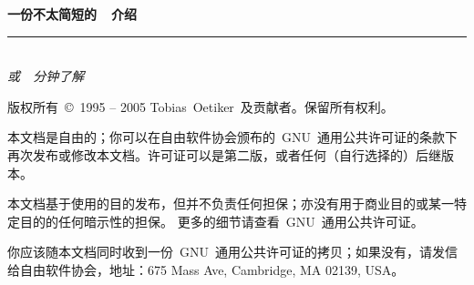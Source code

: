 \thispagestyle{empty}

\noindent\begin{minipage}{\textwidth}
\raggedleft
{\huge \bfseries 一份不太简短的~\LaTeXe{}~介绍}
\noindent\rule[-1ex]{\textwidth}{5pt}\\[2.5ex]
\hfill\emph{\Large 或~\pageref{lshort-minutes}~分钟了解~\LaTeXe}
\end{minipage}

\noindent{}


\newpage\thispagestyle{empty}
\begingroup\small
版权所有~\copyright\ 1995 -- 2005 Tobias\ Oetiker~及贡献者。保留所有权利。

本文档是自由的；你可以在自由软件协会颁布的~GNU~通用公共许可证的条款下
再次发布或修改本文档。许可证可以是第二版，或者任何（自行选择的）后继版本。

本文档基于使用的目的发布，但并不负责任何担保；亦没有用于商业目的或某一特定目的的任何暗示性的担保。
更多的细节请查看~GNU~通用公共许可证。

你应该随本文档同时收到一份~GNU~通用公共许可证的拷贝；如果没有，请发信
给自由软件协会，地址：675 Mass Ave, Cambridge, MA 02139, USA。

\endgroup